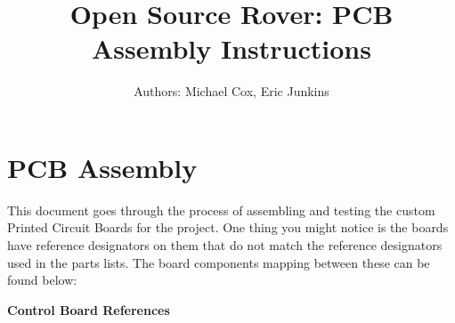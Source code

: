 \documentclass{article}
\begin{document}
\newcommand\partimg{\includegraphics[width=2cm,height=1.0cm,keepaspectratio]}

\title{Open Source Rover: PCB Assembly Instructions}
\author{Authors: Michael Cox, Eric Junkins}

\makeatletter
\def\@maketitle{
\begin{center}
	\makebox[\textwidth][c]{ \texttt{[image: "img/Pictures/Assembly/assembly\_15".png]}}
	{\Huge \bfseries \sffamily \@title }\\[3ex]
	{\Large \sffamily \@author}\\[3ex]
	\texttt{[image: "img/JPL logo".png]}
\end{center}}
\makeatother

\maketitle



\newpage


\tableofcontents

\newpage

\section{PCB Assembly}
This document goes through the process of assembling and testing the custom Printed Circuit Boards for the project. One thing you might notice is the boards have reference designators on them that do not match the reference designators used in the parts lists. The board components mapping between these can be found below:

\bigskip 
\begin{frame}{}
  \centering \Huge
  \textbf{Control Board References}
\end{frame}
\end{document}
